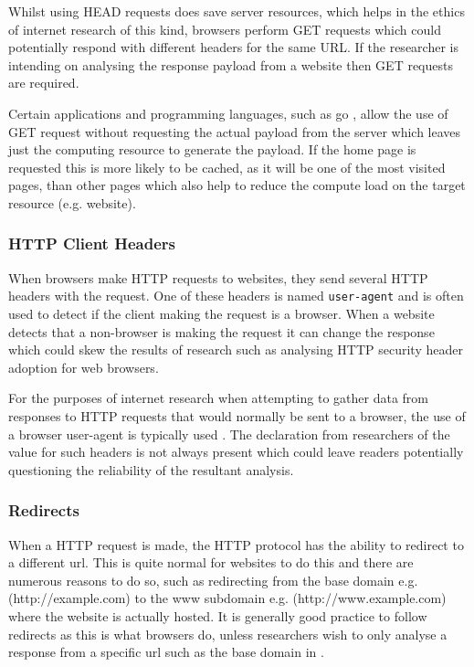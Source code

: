\documentclass{mscreport}
\begin{document}
\vspace{0.3cm} \noindent
Whilst using HEAD requests does save server resources, which helps in the ethics of internet research of this kind, browsers perform GET requests which could potentially respond with different headers for the same URL. If the researcher is intending on analysing the response payload from a website then GET requests \cite{Chen2016-dl,Kumar2017-qw} are required.

\vspace{0.3cm} \noindent
Certain applications and programming languages, such as go \cite{noauthor_undated-lc}, allow the use of GET request without requesting the actual payload from the server which leaves just the computing resource to generate the payload. If the home page is requested this is more likely to be cached, as it will be one of the most visited pages, than other pages which also help to reduce the compute load on the target resource (e.g. website).

\subsubsection{HTTP Client Headers}

When browsers make HTTP requests to websites, they send several HTTP headers with the request. One of these headers is named \texttt{user-agent} and is often used to detect if the client making the request is a browser. When a website detects that a non-browser is making the request it can change the response which could skew the results of research such as analysing HTTP security header adoption for web browsers.

\vspace{0.3cm} \noindent
For the purposes of internet research when attempting to gather data from responses to HTTP requests that would normally be sent to a browser, the use of a browser user-agent is typically used \cite{Buchanan2018-xz, Patil2017-bg,Ying2016-ag,Lavrenovs2018-dl,Poteat2021-zr}. The declaration from researchers of the value for such headers is not always present \cite{Amann2017-co} which could leave readers potentially questioning the reliability of the resultant analysis.

\subsubsection{Redirects}

When a HTTP request is made, the HTTP protocol has the ability to redirect to a different url. This is quite normal for websites to do this and there are numerous reasons to do so, such as redirecting from the base domain e.g. (http://example.com) to the www subdomain e.g. (http://www.example.com) where the website is actually hosted. It is generally good practice to follow redirects as this is what browsers do, unless researchers wish to only analyse a response from a specific url such as the base domain in \cite{Amann2017-co}.
\end{document}
